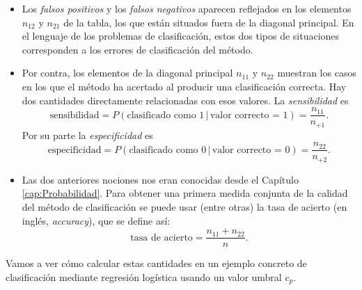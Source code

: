 \begin{itemize}

	\item Los {\em falsos positivos} y los {\em falsos negativos} aparecen reflejados en los elementos $n_{12}$ y $n_{21}$ de la tabla, los que están situados fuera de la diagonal principal. En el lenguaje de los problemas de clasificación, estos dos tipos de situaciones corresponden a los errores de clasificación del método.

	\item Por contra, los elementos de la diagonal principal $n_{11}$ y $n_{22}$ muestran los casos en los que el método ha acertado al producir una clasificación correcta. Hay dos cantidades directamente relacionadas con esos valores. La {\em sensibilidad} es
	\[\mbox{sensibilidad}=P(\mbox{clasificado como 1}\,|\,\mbox{valor correcto = 1})=\dfrac{n_{11}}{n_{+1}}.\]
	Por su parte la {\em especificidad} es
	\[\mbox{especificidad}=P(\mbox{clasificado como 0}\,|\,\mbox{valor correcto = 0})=
	\dfrac{n_{22}}{n_{+2}}.\]
	
	\item Las dos anteriores nociones nos eran conocidas desde el  Capítulo  \ref{cap:Probabilidad}. Para obtener una primera medida conjunta de la calidad del método de clasificación se puede usar (entre otras)  la {\sf tasa de acierto} (en inglés, {\em accuracy}), que se define así:
	\[\mbox{tasa de acierto} = \dfrac{n_{11} + n_{22}}{n}.\]
\end{itemize}
Vamos a ver cómo calcular estas cantidades en un ejemplo concreto de  clasificación mediante regresión logística usando un valor umbral $c_p$.

